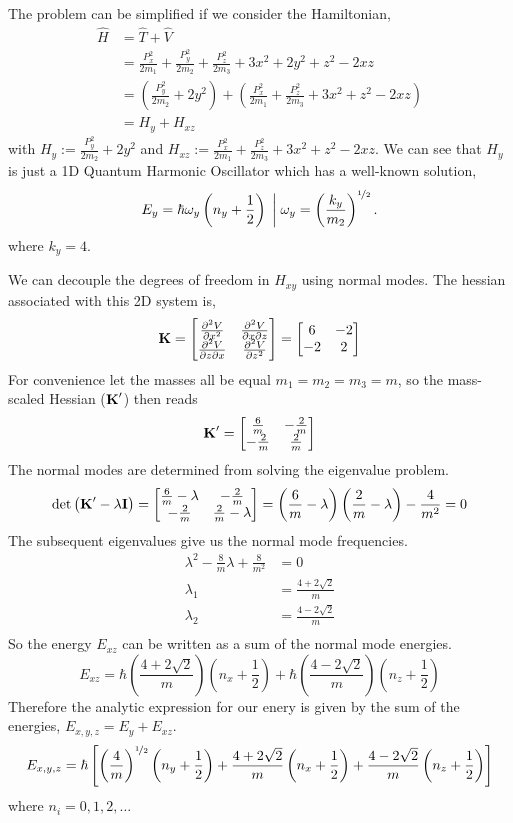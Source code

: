 \documentclass{article}
\newcommand{\be}{\begin{equation}}
\newcommand{\ee}{\end{equation}}
\newcommand{\pd}{\partial}
\newcommand{\half}{\frac{1}{2}}
\newcommand{\nhalf}{\nicefrac{1}{2}}
\newcommand{\bK}{\mbox{\bf K}}
\begin{document}
The problem can be simplified if we consider the Hamiltonian,
\be
\begin{split}
\widehat{H}&= \widehat{T} + \widehat{V} \\
&= \frac{P_x^2}{2m_1}+\frac{P_y^2}{2m_2}+\frac{P_z^2}{2m_3}+3x^2+2y^2+z^2-2xz\\
&= \left( \frac{P_y^2}{2m_2}+2y^2 \right) + \left( \frac{P_x^2}{2m_1}+\frac{P_z^2}{2m_3}+3x^2+z^2-2xz \right)\\
&= H_y + H_{xz}
\end{split}
\ee
with $H_y:=\frac{P_y^2}{2m_2}+2y^2$ and $H_{xz}:=
\frac{P_x^2}{2m_1}+\frac{P_z^2}{2m_3}+3x^2+z^2-2xz$.
We can see that $H_y$ is just a 1D Quantum Harmonic Oscillator which has a well-known solution,
\be
E_y = \hbar \omega_y\left(n_y+\half\right)\;\bigg|\; \omega_y=\left(\frac{k_y}{m_2}\right)^{\nhalf} .
\ee
where $k_y=4$.

We can decouple the degrees of freedom in $H_{xy}$ using normal modes.
The hessian associated with this 2D system is,
\be
\bK = \begin{bmatrix}
\frac{\pd^2 V}{\pd x^2} &\frac{\pd^2 V}{\pd x\pd z} \\
\frac{\pd^2 V}{\pd z\pd x} & \frac{\pd^2 V}{\pd z^2} \\
\end{bmatrix} = \begin{bmatrix}
6 & -2\\
-2 & 2\\
\end{bmatrix}
\ee
For convenience let the masses all be equal $m_1=m_2=m_3=m$, so the mass-scaled
Hessian ($\bK'$) then reads
\be
\bK'= \begin{bmatrix}
\frac{6}{m} & -\frac{2}{m}\\
-\frac{2}{m} & \frac{2}{m}
\end{bmatrix}
\ee
The normal modes are determined from solving the eigenvalue problem.
\be
\det\left(\bK' - \lambda \textbf{I} \right)=
\begin{bmatrix}
\frac{6}{m}-\lambda & -\frac{2}{m}\\
-\frac{2}{m} & \frac{2}{m}-\lambda
\end{bmatrix} = \left(\frac{6}{m}-\lambda\right) \left(\frac{2}{m}-\lambda\right) - \frac{4}{m^2} = 0
\ee
The subsequent eigenvalues give us the normal mode frequencies.
\be
\begin{split}
\lambda^2-\frac{8}{m} \lambda + \frac{8}{m^2} &= 0 \\
\lambda_1&=\frac{4 + 2 \sqrt{2}}{m}\\
\lambda_2&=\frac{4 - 2 \sqrt{2}}{m}\\
\end{split}
\ee
So the energy $E_{xz}$ can be written as a sum of the normal mode energies.
\be
E_{xz} = \hbar \left( \frac{4 + 2 \sqrt{2}}{m} \right) \left( n_x + \half \right) + \hbar \left( \frac{4 - 2 \sqrt{2}}{m} \right) \left( n_z + \half \right)
\ee
Therefore the analytic expression for our enery is given by the sum of the energies, $E_{x,y,z} = E_y + E_{xz}$.
\be
E_{x,y,z} = \hbar\left[\left(\frac{4}{m}\right)^{\nhalf} \left(n_y+\half \right) +
\frac{4 + 2 \sqrt{2}}{m}\left(n_x+\half\right) + \frac{4 - 2 \sqrt{2}}{m}\left(n_z+\half\right) \right]
\ee
where $n_i=0,1,2,\dots$
\end{document}
